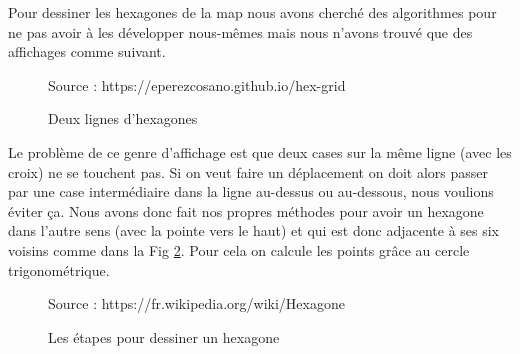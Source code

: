 Pour dessiner les hexagones de la map nous avons cherché des algorithmes pour ne pas avoir à les développer nous-mêmes mais nous n'avons trouvé que des affichages comme suivant.

\begin{figure}[H]
    \centering
    \def\stackalignment{r}
           {\scriptsize%
            Source : https://eperezcosano.github.io/hex-grid}
    \caption{Deux lignes d'hexagones}
    \label{fig:hexmap_exemple}
\end{figure}

Le problème de ce genre d'affichage est que deux cases sur la même ligne (avec les croix) ne se touchent pas. Si on veut faire un déplacement on doit alors passer par une case intermédiaire dans la ligne au-dessus ou au-dessous, nous voulions éviter ça. Nous avons donc fait nos propres méthodes pour avoir un hexagone dans l'autre sens (avec la pointe vers le haut) et qui est donc adjacente à ses six voisins comme dans la Fig \ref{fig:hexagon}. Pour cela on calcule les points grâce au cercle trigonométrique.



\begin{figure}[H]
    \centering
    \def\stackalignment{r}
           {\scriptsize%
            Source : https://fr.wikipedia.org/wiki/Hexagone}
    \caption{Les étapes pour dessiner un hexagone}
    \label{fig:hexagon}
\end{figure}


